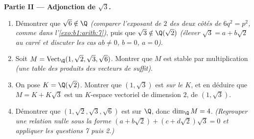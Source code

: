 \begin{problem}
\medskip
\noindent\textbf{Partie II --- Adjonction de $\sqrt3$.}
\begin{enumerate}[resume]
  \item Démontrer que $\sqrt6 \notin \Q$ \emph{(comparer l'exposant
        de $2$ des deux côtés de $6q^2 = p^2$, comme dans
        l'\cref{exo:b1:arith:7})}, puis que $\sqrt3 \notin
        \Q(\sqrt2)$ \emph{(élever $\sqrt3 = a + b\sqrt2$ au carré et
        discuter les cas $ab \neq 0$, $b = 0$, $a = 0$)}.
  \item Soit $M = \operatorname{Vect}_\Q(1, \sqrt2, \sqrt3,
        \sqrt6)$. Montrer que $M$ est stable par multiplication
        \emph{(une table des produits des vecteurs de 
        suffit)}.
  \item On pose $K = \Q(\sqrt2)$. Montrer que $(1, \sqrt3)$ est 
        \emph{sur le  $K$}, et en déduire que $M = K +
        K\sqrt3$ est un $K$-espace vectoriel de dimension $2$, de
         $(1, \sqrt3)$.
  \item Démontrer que $(1, \sqrt2, \sqrt3, \sqrt6)$ est  sur
        $\Q$, donc $\dim_\Q M = 4$. \emph{(Regrouper une relation
        nulle sous la forme $(a + b\sqrt2) + (c + d\sqrt2)\sqrt3 = 0$
        et appliquer les questions 7 puis 2.)}
\end{enumerate}


\end{problem}
